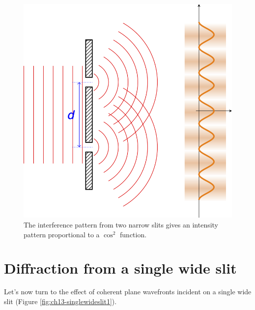 \documentclass[
]{book}
\begin{document}
\begin{figure}

{\centering \includegraphics[width=0.7\linewidth]{visualisations/LaTeX/ch13-cos2-interference} 

}

\caption{The interference pattern from two narrow slits gives an intensity pattern proportional to a $\cos^2$ function.}\label{fig:ch13-cos2fringes}
\end{figure}

\hypertarget{sec:ch13-singlewideslit}{%
\section{Diffraction from a single wide slit}\label{sec:ch13-singlewideslit}}

Let's now turn to the effect of coherent plane wavefronts incident on a single wide slit (Figure \ref{fig:ch13-singlewideslit1}).
\end{document}
